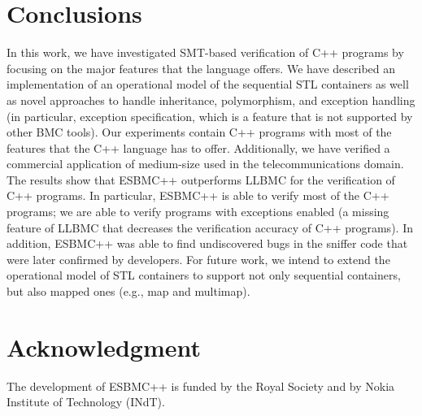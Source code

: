 \documentclass[conference]{IEEEtran}
\begin{document}

\section{Conclusions}
\label{conclusions}

In this work, we have investigated SMT-based verification of C++ programs
by focusing on the major features that the language offers. We have described
an implementation of an operational model of the sequential STL containers
as well as novel approaches to handle inheritance, polymorphism, and exception handling
(in particular, exception specification, which is a feature that is not supported by other
BMC tools). Our experiments contain C++ programs with most of the features that the C++ language
has to offer. Additionally, we have verified a commercial application of medium-size
used in the telecommunications domain. The results show that ESBMC++ outperforms LLBMC
for the verification of C++ programs. In particular, ESBMC++ is able to verify most of the
C++ programs; we are able to verify programs
with exceptions enabled (a missing feature of LLBMC that decreases the verification accuracy of
C++ programs). In addition, ESBMC++ was able to find undiscovered bugs in the sniffer code that
were later confirmed by developers. For future work, we intend to extend the operational model of STL containers
to support not only sequential containers, but also mapped ones (e.g., map and multimap).




\section*{Acknowledgment}
The development of ESBMC++ is funded by the Royal Society and by Nokia Institute of Technology (INdT).

\end{document}
